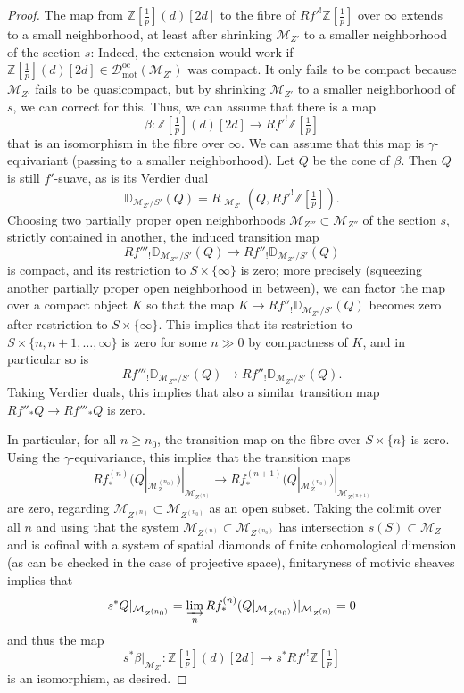 \documentclass[11pt]{amsart}
\DeclareMathOperator{\sHom}{\!{\mathscr{H}\! om}}
\numberwithin{equation}{section}
\numberwithin{theorem}{section}
\theoremstyle{definition}
\begin{document}
\begin{proof}
The map from $\mathbb Z[\tfrac 1p](d)[2d]$ to the fibre of $Rf'^! \mathbb Z[\tfrac 1p]$ over $\infty$ extends to a small neighborhood, at least after shrinking $\mathcal M_{Z'}$ to a smaller neighborhood of the section $s$: Indeed, the extension would work if $\mathbb Z[\tfrac 1p](d)[2d]\in \mathcal D_{\mathrm{mot}}^{\mathrm{oc}}(\mathcal M_{Z'})$ was compact. It only fails to be compact because $\mathcal M_{Z'}$ fails to be quasicompact, but by shrinking $\mathcal M_{Z'}$ to a smaller neighborhood of $s$, we can correct for this. Thus, we can assume that there is a map
\[
\beta: \mathbb Z[\tfrac 1p](d)[2d]\to Rf'^! \mathbb Z[\tfrac 1p]
\]
that is an isomorphism in the fibre over $\infty$. We can assume that this map is $\gamma$-equivariant (passing to a smaller neighborhood). Let $Q$ be the cone of $\beta$. Then $Q$ is still $f'$-suave, as is its Verdier dual
\[
\mathbb D_{\mathcal M_{Z'}/S'}(Q) = R\sHom_{\mathcal M_{Z'}}(Q,Rf'^! \mathbb Z[\tfrac 1p]).
\]
Choosing two partially proper open neighborhoods $\mathcal M_{Z'''}\subset \mathcal M_{Z''}$ of the section $s$, strictly contained in another, the induced transition map
\[
Rf'''_!\mathbb D_{\mathcal M_{Z'''}/S'}(Q)\to Rf''_!\mathbb D_{\mathcal M_{Z''}/S'}(Q)
\]
is compact, and its restriction to $S\times \{\infty\}$ is zero; more precisely (squeezing another partially proper open neighborhood in between), we can factor the map over a compact object $K$ so that the map $K\to Rf''_!\mathbb D_{\mathcal M_{Z''}/S'}(Q)$ becomes zero after restriction to $S\times \{\infty\}$. This implies that its restriction to $S\times \{n,n+1,\ldots,\infty\}$ is zero for some $n\gg 0$ by compactness of $K$, and in particular so is
\[
Rf'''_!\mathbb D_{\mathcal M_{Z'''}/S'}(Q)\to Rf''_!\mathbb D_{\mathcal M_{Z''}/S'}(Q).
\]
Taking Verdier duals, this implies that also a similar transition map $Rf''_\ast Q\to Rf'''_\ast Q$ is zero.

In particular, for all $n\geq n_0$, the transition map on the fibre over $S\times\{n\}$ is zero. Using the $\gamma$-equivariance, this implies that the transition maps
\[
Rf^{(n)}_\ast (Q|_{\mathcal M_Z^{(n_0)}})|_{\mathcal M_{Z^{(n)}}}\to Rf^{(n+1)}_\ast (Q|_{\mathcal M_Z^{(n_0)}})|_{\mathcal M_{Z^{(n+1)}}}
\]
are zero, regarding $\mathcal M_{Z^{(n)}}\subset \mathcal M_{Z^{(n_0)}}$ as an open subset. Taking the colimit over all $n$ and using that the system $\mathcal M_{Z^{(n)}}\subset \mathcal M_{Z^{(n_0)}}$ has intersection $s(S)\subset \mathcal M_Z$ and is cofinal with a system of spatial diamonds of finite cohomological dimension (as can be checked in the case of projective space), finitaryness of motivic sheaves implies that
\[
s^\ast Q|_{\mathcal M_{Z^{(n_0)}}} = \varinjlim_n Rf^{(n)}_\ast (Q|_{\mathcal M_{Z^{(n_0)}}})|_{\mathcal M_{Z^{(n)}}} = 0
\]
and thus the map
\[
s^\ast \beta|_{\mathcal M_{Z'}}: \mathbb Z[\tfrac 1p](d)[2d]\to s^\ast Rf'^! \mathbb Z[\tfrac 1p]
\]
is an isomorphism, as desired.
\end{proof}
\end{document}
